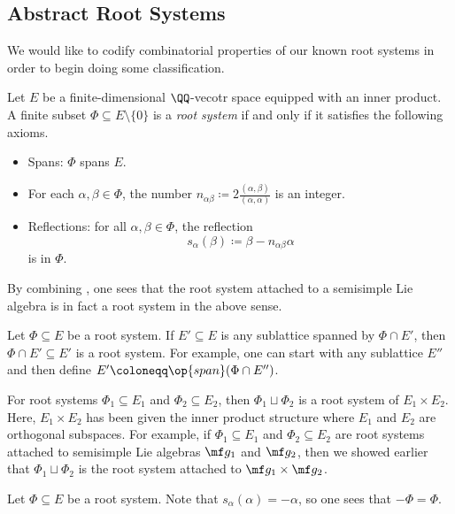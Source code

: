 \documentclass[../notes.tex]{subfiles}
\begin{document}
\subsection{Abstract Root Systems}
We would like to codify combinatorial properties of our known root systems in order to begin doing some classification.
\begin{definition}
	Let $E$ be a finite-dimensional $\QQ$-vecotr space equipped with an inner product. A finite subset $\Phi\subseteq E\setminus\{0\}$ is a \textit{root system} if and only if it satisfies the following axioms.
	\begin{itemize}
		\item Spans: $\Phi$ spans $E$.
		\item For each $\alpha,\beta\in\Phi$, the number $n_{\alpha\beta}\coloneqq2\frac{(\alpha,\beta)}{(\alpha,\alpha)}$ is an integer.
		\item Reflections: for all $\alpha,\beta\in\Phi$, the reflection
		\[s_\alpha(\beta)\coloneqq\beta-n_{\alpha\beta}\alpha\]
		is in $\Phi$.
	\end{itemize}
\end{definition}
\begin{example}
	By combining , one sees that the root system attached to a semisimple Lie algebra is in fact a root system in the above sense.
\end{example}
\begin{example}
	Let $\Phi\subseteq E$ be a root system. If $E'\subseteq E$ is any sublattice spanned by $\Phi\cap E'$, then $\Phi\cap E'\subseteq E'$ is a root system. For example, one can start with any sublattice $E''$ and then define $E'\coloneqq\op{span}(\Phi\cap E'')$.
\end{example}
\begin{example}
	For root systems $\Phi_1\subseteq E_1$ and $\Phi_2\subseteq E_2$, then $\Phi_1\sqcup\Phi_2$ is a root system of $E_1\times E_2$. Here, $E_1\times E_2$ has been given the inner product structure where $E_1$ and $E_2$ are orthogonal subspaces. For example, if $\Phi_1\subseteq E_1$ and $\Phi_2\subseteq E_2$ are root systems attached to semisimple Lie algebras $\mf g_1$ and $\mf g_2$, then we showed earlier that $\Phi_1\sqcup\Phi_2$ is the root system attached to $\mf g_1\times\mf g_2$.
\end{example}
\begin{remark}
	Let $\Phi\subseteq E$ be a root system. Note that $s_\alpha(\alpha)=-\alpha$, so one sees that $-\Phi=\Phi$.
\end{remark}
\end{document}
